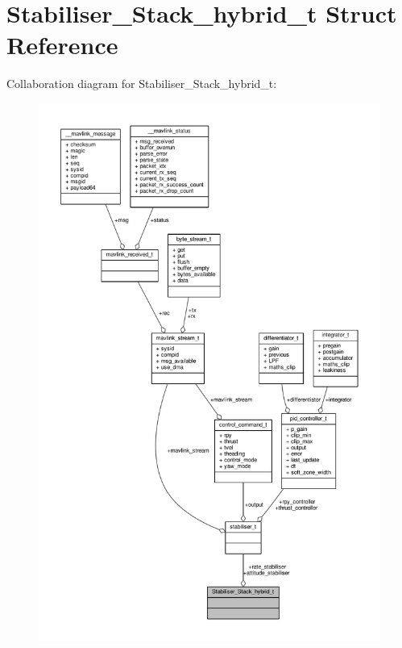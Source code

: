 \hypertarget{structStabiliser__Stack__hybrid__t}{\section{Stabiliser\+\_\+\+Stack\+\_\+hybrid\+\_\+t Struct Reference}
\label{structStabiliser__Stack__hybrid__t}
}


Collaboration diagram for Stabiliser\+\_\+\+Stack\+\_\+hybrid\+\_\+t\+:
\nopagebreak
\begin{figure}[H]
\begin{center}
\leavevmode
\includegraphics[width=350pt]{structStabiliser__Stack__hybrid__t__coll__graph}
\end{center}
\end{figure}
